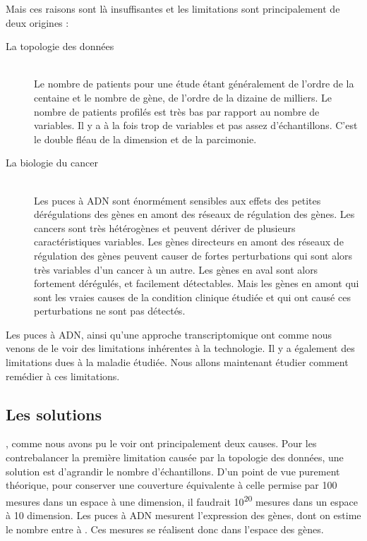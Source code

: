        Mais ces raisons sont là insuffisantes et les limitations sont principalement de deux origines :
      \begin{description}
        \item [La topologie des données]   \hfill \\
          Le nombre de patients pour une étude étant généralement de l'ordre de la centaine et le nombre de gène, de l'ordre de la dizaine de milliers.
          Le nombre de patients profilés est très bas par rapport au nombre de variables.
          Il y a à la fois trop de variables et pas assez d'échantillons.
          C'est le double fléau de la dimension et de la parcimonie.
        \item [La biologie du cancer]      \hfill \\
          Les puces à \acs{ADN} sont énormément sensibles aux effets des petites dérégulations des gènes en amont des réseaux de régulation des gènes.
          Les cancers sont très hétérogènes et peuvent dériver de plusieurs caractéristiques variables.
          Les gènes directeurs en amont des réseaux de régulation des gènes peuvent causer de fortes perturbations qui sont alors très variables d'un cancer à un autre.
          Les gènes en aval sont alors fortement dérégulés, et facilement détectables.
          Mais les gènes en amont qui sont les vraies causes de la condition clinique étudiée et qui ont causé ces perturbations ne sont pas détectés.
      \end{description}
      \vspace{1.5ex}

      Les puces à \acs{ADN}, ainsi qu'une approche transcriptomique ont comme nous venons de le voir des limitations inhérentes à la technologie.
      Il y a également des limitations dues à la maladie étudiée.
      Nous allons maintenant étudier comment remédier à ces limitations.

    \subsection{\textcolor{myred}{Les solutions}}

      , comme nous avons pu le voir ont principalement deux causes.
      Pour les contrebalancer la première limitation causée par la topologie des données, une solution est d'agrandir le nombre d'échantillons.
      D'un point de vue purement théorique, pour conserver une couverture équivalente à celle permise par 100 mesures dans un espace à une dimension, il faudrait 10\textsuperscript{20} mesures dans un espace à 10 dimension.
      Les puces à \acs{ADN} mesurent l'expression des gènes, dont on estime le nombre entre  à .
      Ces mesures se réalisent donc dans l'espace des gènes.


